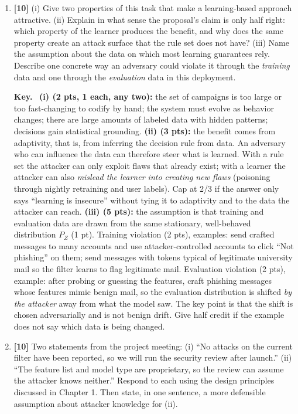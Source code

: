 \documentclass[10pt,a4paper]{extarticle}
\newcommand{\pts}[1]{\textbf{\color{accent}[#1]}\enspace}
\newenvironment{sol}{\par\smallskip
    \begin{tcolorbox}[colback=accent!6, colframe=accent, boxrule=0.5pt, arc=1pt,
                      left=5pt, right=5pt, top=2pt, bottom=2pt, breakable, fontupper=\small]
    \textbf{\color{accent}Key.}\ }{\end{tcolorbox}\par}
\begin{document}
\begin{enumerate}[label=(\alph*)]
\item \pts{10} (i) Give two properties of this task that make a learning-based approach attractive. (ii) Explain in what sense the proposal's claim is only half right: which property of the learner produces the benefit, and why does the same property create an attack surface that the rule set does not have? (iii) Name the assumption about the data on which most learning guarantees rely. Describe one concrete way an adversary could violate it through the \emph{training} data and one through the \emph{evaluation} data in this deployment.

\begin{sol}
\textbf{(i) (2 pts, 1 each, any two):} the set of campaigns is too large or too fast-changing to codify by hand; the system must evolve as behavior changes; there are large amounts of labeled data with hidden patterns; decisions gain statistical grounding. \textbf{(ii) (3 pts):} the benefit comes from adaptivity, that is, from inferring the decision rule from data. An adversary who can influence the data can therefore steer what is learned. With a rule set the attacker can only exploit flaws that already exist; with a learner the attacker can also \emph{mislead the learner into creating new flaws} (poisoning through nightly retraining and user labels). Cap at 2/3 if the answer only says ``learning is insecure'' without tying it to adaptivity and to the data the attacker can reach. \textbf{(iii) (5 pts):} the assumption is that training and evaluation data are drawn from the same stationary, well-behaved distribution \(P_Z\) (1 pt). Training violation (2 pts), examples: send crafted messages to many accounts and use attacker-controlled accounts to click ``Not phishing'' on them; send messages with tokens typical of legitimate university mail so the filter learns to flag legitimate mail. Evaluation violation (2 pts), example: after probing or guessing the features, craft phishing messages whose features mimic benign mail, so the evaluation distribution is shifted \emph{by the attacker} away from what the model saw. The key point is that the shift is chosen adversarially and is not benign drift. Give half credit if the example does not say which data is being changed.
\end{sol}

\item \pts{10} Two statements from the project meeting: (i) ``No attacks on the current filter have been reported, so we will run the security review after launch.'' (ii) ``The feature list and model type are proprietary, so the review can assume the attacker knows neither.'' Respond to each using the design principles discussed in Chapter 1. Then state, in one sentence, a more defensible assumption about attacker knowledge for (ii).


\end{enumerate}
\end{document}
